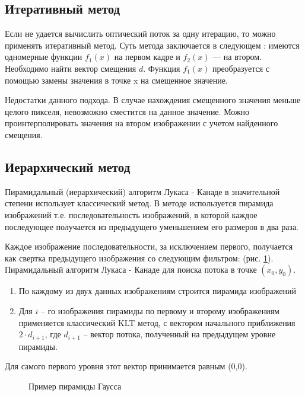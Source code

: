 \subsection{Итеративный метод}
Если не удается вычислить оптический поток за одну итерацию, то можно применять итеративный метод.  Суть метода заключается в следующем :  имеются одномерные функции $f_1(x)$ на первом кадре и $f_2(x)$ —  на втором. Необходимо найти вектор смещения $d$. Функция $f_1(x)$ преобразуется с помощью замены значения в точке x на смещенное значение.

Недостатки данного подхода. В случае нахождения смещенного значения меньше целого пикселя, невозможно сместится на данное значение. Можно проинтерполировать значения на втором изображении с учетом найденного смещения.
 
\subsection{Иерархический метод}
Пирамидальный (иерархический) алгоритм Лукаса - Канаде в значительной степени использует классический метод. В методе используется пирамида изображений т.е. последовательность изображений, в которой каждое последующее получается из предыдущего уменьшением его размеров в два раза.

Каждое изображение последовательности, за исключением первого, получается как свертка предыдущего изображения со следующим фильтром:
(рис. \ref{pic:pyramid}).
Пирамидальный алгоритм Лукаса - Канаде для поиска потока в точке $(x_0,y_0)$. 
\begin{enumerate}
\item По каждому из двух данных изображениям строится пирамида изображений
\item Для $i$ – го изображения пирамиды по первому и второму изображениям применяется классический KLT метод, с вектором начального приближения $2 \cdot d_{i+1}$, где $d_{i+1}$ – вектор потока, полученный на предыдущем уровне пирамиды.
\end{enumerate} 
Для самого первого уровня этот вектор принимается равным (0,0).


\begin{figure}[ht]
\caption{Пример пирамиды Гаусса}
\label{pic:pyramid}
\end{figure}